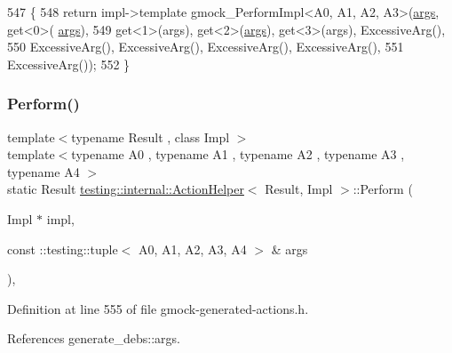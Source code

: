 \begin{DoxyCode}
547                  \{
548     \textcolor{keywordflow}{return} impl->template gmock\_PerformImpl<A0, A1, A2, A3>(\hyperlink{namespacegenerate__debs_a75f9143e38df82d83b2e8a6f99cae02c}{args}, get<0>(
      \hyperlink{namespacegenerate__debs_a75f9143e38df82d83b2e8a6f99cae02c}{args}),
549         get<1>(args), get<2>(\hyperlink{namespacegenerate__debs_a75f9143e38df82d83b2e8a6f99cae02c}{args}), get<3>(args), ExcessiveArg(),
550         ExcessiveArg(), ExcessiveArg(), ExcessiveArg(), ExcessiveArg(),
551         ExcessiveArg());
552   \}
\end{DoxyCode}
\mbox{\label{classtesting_1_1internal_1_1ActionHelper_afd2d1dcea480db63416fc3b8604dec56}} 
\subsubsection{\texorpdfstring{Perform()}{Perform()}\hspace{0.1cm}{\footnotesize\ttfamily [6/11]}}
{\footnotesize\ttfamily template$<$typename Result , class Impl $>$ \\
template$<$typename A0 , typename A1 , typename A2 , typename A3 , typename A4 $>$ \\
static Result \hyperlink{classtesting_1_1internal_1_1ActionHelper}{testing\+::internal\+::\+Action\+Helper}$<$ Result, Impl $>$\+::Perform (\begin{DoxyParamCaption}\item[{Impl $\ast$}]{impl,  }\item[{const \+::testing\+::tuple$<$ A0, A1, A2, A3, A4 $>$ \&}]{args }\end{DoxyParamCaption})\hspace{0.3cm}{\ttfamily [inline]}, {\ttfamily [static]}}



Definition at line 555 of file gmock-\/generated-\/actions.\+h.



References generate\+\_\+debs\+::args.


